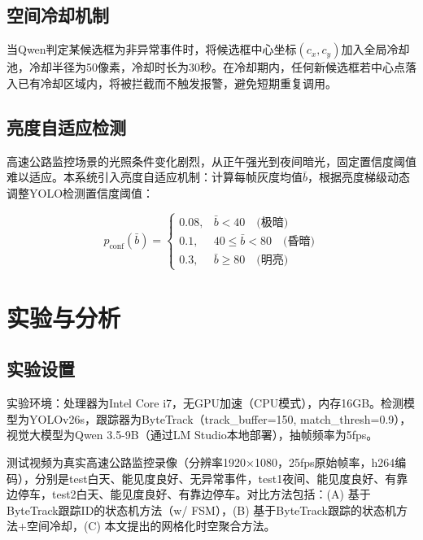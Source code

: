 \documentclass[10.5pt,a4paper,twoside,twocolumn]{ctexart}
\begin{document}
\subsection{空间冷却机制}

当Qwen判定某候选框为非异常事件时，将候选框中心坐标$(c_x,c_y)$加入全局冷却池，冷却半径为50像素，冷却时长为30秒。在冷却期内，任何新候选框若中心点落入已有冷却区域内，将被拦截而不触发报警，避免短期重复调用。

\subsection{亮度自适应检测}

高速公路监控场景的光照条件变化剧烈，从正午强光到夜间暗光，固定置信度阈值难以适应。本系统引入亮度自适应机制：计算每帧灰度均值$\bar{b}$，根据亮度梯级动态调整YOLO检测置信度阈值：

\begin{equation}
p_{\text{conf}}(\bar{b}) = \begin{cases}
0.08, & \bar{b} < 40 \quad\text{(极暗)}\\
0.1, & 40 \leq \bar{b} < 80 \quad\text{(昏暗)}\\
0.3, & \bar{b} \geq 80 \quad\text{(明亮)}
\end{cases}
\end{equation}

\section{\heiti{} 实验与分析}

\subsection{实验设置}

实验环境：处理器为Intel Core i7，无GPU加速（CPU模式），内存16GB。检测模型为YOLOv26s，跟踪器为ByteTrack（track\_buffer=150, match\_thresh=0.9），视觉大模型为Qwen 3.5-9B（通过LM Studio本地部署），抽帧频率为5fps。

测试视频为真实高速公路监控录像（分辨率1920×1080，25fps原始帧率，h264编码），分别是test白天、能见度良好、无异常事件，test1夜间、能见度良好、有靠边停车，test2白天、能见度良好、有靠边停车。对比方法包括：(A) 基于ByteTrack跟踪ID的状态机方法（w/ FSM），(B) 基于ByteTrack跟踪的状态机方法+空间冷却，(C) 本文提出的网格化时空聚合方法。
\end{document}
